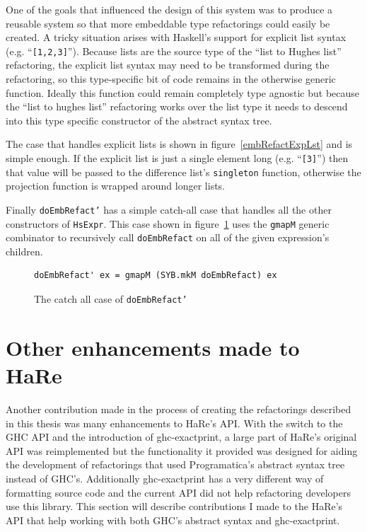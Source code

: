 One of the goals that influenced the design of this system was to produce a reusable system so that more embeddable type refactorings could easily be created. A tricky situation arises with Haskell's support for explicit list syntax (e.g. ``\texttt{[1,2,3]}''). Because lists are the source type of the ``list to Hughes list'' refactoring, the explicit list syntax may need to be transformed during the refactoring, so this type-specific bit of code remains in the otherwise generic function. Ideally this function could remain completely type agnostic but because the ``list to hughes list'' refactoring works over the list type it needs to descend into this type specific constructor of the abstract syntax tree.

The case that handles explicit lists is shown in figure~\ref{embRefactExpLst} and is simple enough. If the explicit list is just a single element long (e.g. ``\texttt{[3]}'') then that value will be passed to the difference list's \texttt{singleton} function, otherwise the projection function is wrapped around longer lists. 

Finally \texttt{doEmbRefact'} has a simple catch-all case that handles all the other constructors of \texttt{HsExpr}. This case shown in figure~\ref{doEmbCatchAll} uses the \texttt{gmapM} generic combinator to recursively call \texttt{doEmbRefact} on all of the given expression's children. 

\begin{figure}[t]
\begin{lstlisting}
doEmbRefact' ex = gmapM (SYB.mkM doEmbRefact) ex
\end{lstlisting}
\caption{The catch all case of \texttt{doEmbRefact'}}
\label{doEmbCatchAll}
\end{figure}

\section{Other enhancements made to HaRe}
\label{hareAPI}

Another contribution made in the process of creating the refactorings described in this thesis was many enhancements to HaRe's API. With the switch to the GHC API and the introduction of ghc-exactprint, a large part of HaRe's original API was reimplemented but the functionality it provided was designed for aiding the development of refactorings that used Programatica's abstract syntax tree instead of GHC's. Additionally ghc-exactprint has a very different way of formatting source code and the current API did not help refactoring developers use this library. This section will describe contributions I made to the HaRe's API that help working with both GHC's abstract syntax and ghc-exactprint.

